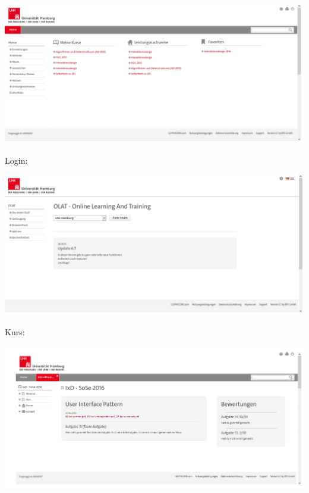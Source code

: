\documentclass[a4paper,10pt]{article}
\begin{document}
\includegraphics[scale=0.4]{images/wilkommen_seite.png}

Login:

\includegraphics[scale=0.4]{images/login_seite.png}

Kurs:

\includegraphics[scale=0.4]{images/ixd_seite.png}
\end{document}
